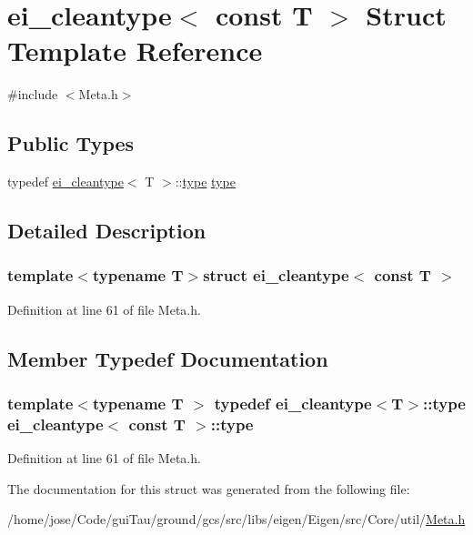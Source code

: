 \hypertarget{structei__cleantype_3_01const_01_t_01_4}{\section{ei\-\_\-cleantype$<$ const T $>$ Struct Template Reference}
\label{structei__cleantype_3_01const_01_t_01_4}
}


{\ttfamily \#include $<$Meta.\-h$>$}

\subsection*{Public Types}
\begin{DoxyCompactItemize}
\item 
typedef \hyperlink{structei__cleantype}{ei\-\_\-cleantype}$<$ T $>$\-::\hyperlink{structei__cleantype_3_01const_01_t_01_4_af4238a34930f22793765f4c374a04df0}{type} \hyperlink{structei__cleantype_3_01const_01_t_01_4_af4238a34930f22793765f4c374a04df0}{type}
\end{DoxyCompactItemize}


\subsection{Detailed Description}
\subsubsection*{template$<$typename T$>$struct ei\-\_\-cleantype$<$ const T $>$}



Definition at line 61 of file Meta.\-h.



\subsection{Member Typedef Documentation}
\hypertarget{structei__cleantype_3_01const_01_t_01_4_af4238a34930f22793765f4c374a04df0}{
\subsubsection[{type}]{\setlength{\rightskip}{0pt plus 5cm}template$<$typename T $>$ typedef {\bf ei\-\_\-cleantype}$<$T$>$\-::{\bf type} {\bf ei\-\_\-cleantype}$<$ const T $>$\-::{\bf type}}}\label{structei__cleantype_3_01const_01_t_01_4_af4238a34930f22793765f4c374a04df0}


Definition at line 61 of file Meta.\-h.



The documentation for this struct was generated from the following file\-:\begin{DoxyCompactItemize}
\item 
/home/jose/\-Code/gui\-Tau/ground/gcs/src/libs/eigen/\-Eigen/src/\-Core/util/\hyperlink{_meta_8h}{Meta.\-h}\end{DoxyCompactItemize}
